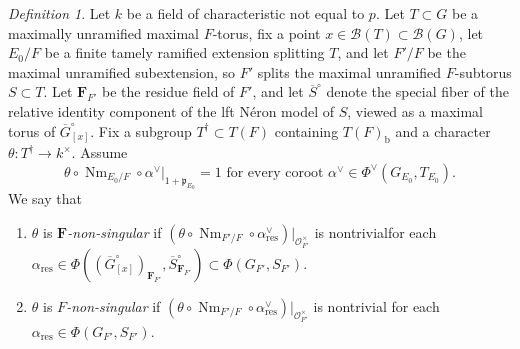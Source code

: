 \documentclass[reqno]{amsart}
\numberwithin{equation}{subsection}
\newcommand{\F}{\mathbf{F}}
\newcommand{\ol}[1]{\overline{#1}}
\newcommand{\co}{\colon}
\newcommand\cA{\mathcal{A}}
\newcommand\cB{\mathcal{B}}
\newcommand\cO{\mathcal{O}}
\newcommand\frp{\mathfrak{p}}
\DeclareMathOperator{\Nm}{Nm}
\newtheorem{lemma}[thm]{Lemma}
\theoremstyle{remark}
\newtheorem{defn}[thm]{Definition}
\numberwithin{equation}{subsection}
\numberwithin{figure}{subsection}
\begin{document}
\begin{defn}\label{defn:depth-0-nonsingular}
Let $k$ be a field of characteristic not equal to $p$. Let $T \subset G$ be a maximally unramified maximal $F$-torus, fix a point $x \in \cB(T) \subset \cB(G)$, let $E_0/F$ be a finite tamely ramified extension splitting $T$, and let $F'/F$ be the maximal unramified subextension, so $F'$ splits the maximal unramified $F$-subtorus $S \subset T$. Let $\F_{F'}$ be the residue field of $F'$, and let $\ol S^\circ$ denote the special fiber of the relative identity component of the lft N\'eron model of $S$, viewed as a maximal torus of $\ol G_{[x]}^\circ$. Fix a subgroup $T^\dagger \subset T(F)$ containing $T(F)_{\mathrm{b}}$ and a character $\theta\co T^\dagger\to k^\times$. Assume
\begin{equation}\label{eqn:nonvanishing-on-absolute-coroots}
\theta \circ \Nm_{E_0/F} \circ \alpha^\vee|_{1 + \frp_{E_0}} = 1 \text{ for every coroot } \alpha^\vee \in \Phi^\vee(G_{E_0}, T_{E_0}).
\end{equation}
We say that
\begin{enumerate}
\item $\theta$ is \textit{$\F$-non-singular} if $(\theta \circ \Nm_{F'/F} \circ \alpha_{\mathrm{res}}^\vee)|_{\cO_{F'}^\times}$ is nontrivial\newline for each $\alpha_{\mathrm{res}} \in \Phi((\ol G_{[x]}^\circ)_{\F_{F'}}, \ol S^\circ_{\F_{F'}}) \subset \Phi(G_{F'}, S_{F'})$.
\item $\theta$ is \textit{$F$-non-singular} if $(\theta \circ \Nm_{F'/F} \circ \alpha_{\mathrm{res}}^\vee)|_{\cO_{F'}^\times}$ is nontrivial for each $\alpha_{\mathrm{res}} \in \Phi(G_{F'}, S_{F'})$.
\end{enumerate}
\end{defn}


\end{document}

